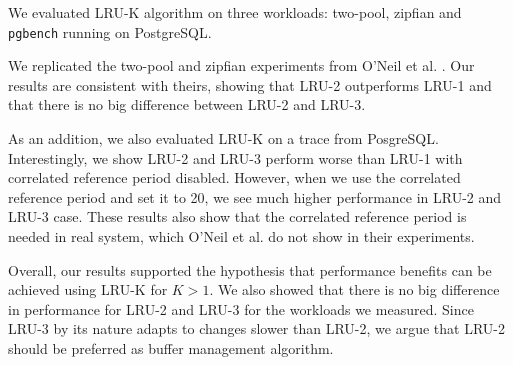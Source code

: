 We evaluated LRU-K algorithm on three workloads: two-pool, zipfian and \texttt{pgbench} running on PostgreSQL. 

We replicated the two-pool and zipfian experiments from O'Neil et al. \cite{lruk}. Our results are consistent with theirs, showing that LRU-2 outperforms LRU-1 and that there is no big difference between LRU-2 and LRU-3.

As an addition, we also evaluated LRU-K on a trace from PosgreSQL. Interestingly, we show LRU-2 and LRU-3 perform worse than LRU-1 with correlated reference period disabled. However, when we use the correlated reference period and set it to 20, we see much higher performance in LRU-2 and LRU-3 case. These results also show that the correlated reference period is needed in real system, which O'Neil et al. \cite{lruk} do not show in their experiments.

Overall, our results supported the hypothesis that performance benefits can be achieved using LRU-K for $K > 1$. We also showed that there is no big difference in performance for LRU-2 and LRU-3 for the workloads we measured. Since LRU-3 by its nature adapts to changes slower than LRU-2, we argue that LRU-2 should be preferred as buffer management algorithm.